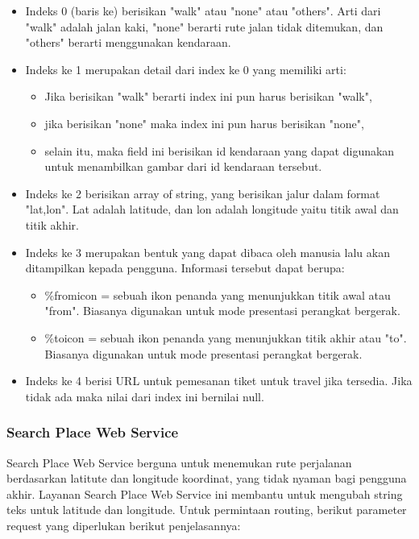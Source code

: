 \begin{itemize}
	\item Indeks 0 (baris ke) berisikan "walk" atau "none" atau "others". Arti dari "walk" adalah jalan kaki, "none" berarti rute jalan tidak ditemukan, dan "others" berarti menggunakan kendaraan.
	\item Indeks ke 1 merupakan detail dari index ke 0 yang memiliki arti:
	\begin{itemize}
		\item Jika berisikan "walk" berarti index ini pun harus berisikan "walk",
		\item jika berisikan "none" maka index ini pun harus berisikan "none",
		\item selain itu, maka field ini berisikan id kendaraan yang dapat digunakan untuk menambilkan gambar dari id kendaraan tersebut.
	\end{itemize}
	\item Indeks ke 2 berisikan array of string, yang berisikan jalur dalam format "lat,lon". Lat adalah latitude, dan lon adalah longitude yaitu titik awal dan titik akhir.
	\item Indeks ke 3 merupakan bentuk yang dapat dibaca oleh manusia lalu akan ditampilkan kepada pengguna. Informasi tersebut dapat berupa:
	\begin{itemize}
		\item \%fromicon = sebuah ikon penanda yang menunjukkan titik awal atau "from". Biasanya digunakan untuk mode presentasi perangkat bergerak.
		\item \%toicon = sebuah ikon penanda yang menunjukkan titik akhir atau "to". Biasanya digunakan untuk mode presentasi perangkat bergerak.
	\end{itemize}
	\item Indeks ke 4 berisi URL untuk pemesanan tiket untuk travel jika tersedia. Jika tidak ada maka nilai dari index ini bernilai null.
\end{itemize}


\subsubsection{Search Place Web Service}
Search Place Web Service berguna untuk menemukan rute perjalanan berdasarkan latitute dan longitude koordinat, yang tidak nyaman bagi pengguna akhir. Layanan Search Place Web Service ini membantu untuk mengubah string teks untuk latitude dan longitude. Untuk permintaan routing, berikut parameter request yang diperlukan berikut penjelasannya:

